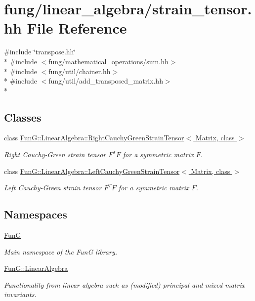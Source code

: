 \hypertarget{strain__tensor_8hh}{\section{fung/linear\-\_\-algebra/strain\-\_\-tensor.hh File Reference}
\label{strain__tensor_8hh}
}
{\ttfamily \#include \char`\"{}transpose.\-hh\char`\"{}}\\*
{\ttfamily \#include $<$fung/mathematical\-\_\-operations/sum.\-hh$>$}\\*
{\ttfamily \#include $<$fung/util/chainer.\-hh$>$}\\*
{\ttfamily \#include $<$fung/util/add\-\_\-transposed\-\_\-matrix.\-hh$>$}\\*
\subsection*{Classes}
\begin{DoxyCompactItemize}
\item 
class \hyperlink{classFunG_1_1LinearAlgebra_1_1RightCauchyGreenStrainTensor}{Fun\-G\-::\-Linear\-Algebra\-::\-Right\-Cauchy\-Green\-Strain\-Tensor$<$ Matrix, class $>$}
\begin{DoxyCompactList}\small\item\em Right Cauchy-\/\-Green strain tensor $ F^T F $ for a symmetric matrix $ F $. \end{DoxyCompactList}\item 
class \hyperlink{classFunG_1_1LinearAlgebra_1_1LeftCauchyGreenStrainTensor}{Fun\-G\-::\-Linear\-Algebra\-::\-Left\-Cauchy\-Green\-Strain\-Tensor$<$ Matrix, class $>$}
\begin{DoxyCompactList}\small\item\em Left Cauchy-\/\-Green strain tensor $ F^T F $ for a symmetric matrix $ F $. \end{DoxyCompactList}\end{DoxyCompactItemize}
\subsection*{Namespaces}
\begin{DoxyCompactItemize}
\item 
\hyperlink{namespaceFunG}{Fun\-G}
\begin{DoxyCompactList}\small\item\em Main namespace of the Fun\-G library. \end{DoxyCompactList}\item 
\hyperlink{namespaceFunG_1_1LinearAlgebra}{Fun\-G\-::\-Linear\-Algebra}
\begin{DoxyCompactList}\small\item\em Functionality from linear algebra such as (modified) principal and mixed matrix invariants. \end{DoxyCompactList}\end{DoxyCompactItemize}
